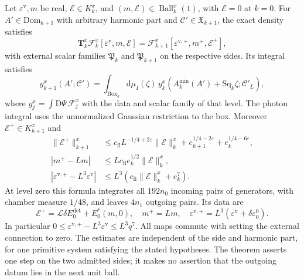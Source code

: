 \documentclass[11pt,letterpaper,reqno]{amsart}
\newcommand{\dd}{\mathrm d}
\begin{document}
\begin{theorem}
Let $\varepsilon^{\mathrm v},m$ be real,
$\mathscr E\in K_k^x$, and
$(m,\mathscr E)\in\operatorname{Ball}_k^x(1)$, with
$\mathscr E=0$ at $k=0$. For $A'\in\mathrm{Dom}_{k+1}$
with arbitrary harmonic part and
$\mathscr C'\in\mathfrak X_{k+1}$, the exact density satisfies
\begin{equation}\label{eq:rgnl-exact-step}
 \mathbf T_k^x\mathscr F_k^x[\varepsilon^{\mathrm v},m,\mathscr E]
   =\mathscr F_{k+1}^x
            [\varepsilon^{\mathrm v,+},m^+,\mathscr E^+],
\end{equation}
with external scalar families $\mathfrak P_k$ and
$\mathfrak P_{k+1}$ on the respective sides.
Its integral satisfies
\begin{equation}\label{eq:rgnl-integrated-step}
 y_{k+1}^x(A';\mathscr C')
  =\int_{\mathrm{Box}_k}\dd\mu_I(\zeta)\,
        y_k^x(A_k^{\min}(A')+\mathrm{Sq}_k\zeta;\mathscr C'_L),
\end{equation}
where $y_j^x=\int\mathrm D\Psi\,\mathscr F_j^x$ with the
data and scalar family of that level. The photon integral uses the
unnormalized Gaussian restriction to the box.
Moreover $\mathscr E^+\in K_{k+1}^x$ and
\begin{align}
 \|\mathscr E^+\|_{k+1}^x
 &\le c_{\mathrm{fl}}L^{-1/4+2\varepsilon}\|\mathscr E\|_k^x
           +e_{k+1}^{1/4-2\varepsilon}+e_k^{1/4-6\varepsilon},
                                      \label{eq:rgnl-activity-step-bound}\\
 |m^+-Lm|
 &\le Lc_{\mathrm{fl}}e_k^{1/2}\|\mathscr E\|_k^x,
                                      \label{eq:rgnl-mass-step-bound}\\
 |\varepsilon^{\mathrm v,+}-L^3\varepsilon^{\mathrm v}|
 &\le L^3(c_{\mathrm{fl}}\|\mathscr E\|_k^x+e_k^7).
                                      \label{eq:rgnl-vacuum-step-bound}
\end{align}
At level zero this formula integrates all $192n_0$
incoming pairs of generators, with chamber measure $1/48$,
and leaves $4n_1$ outgoing pairs. Its data are
\[
 \mathscr E^+=\mathcal L\delta E_0^{\mathrm{det}}+E_0^*(m,0),
 \quad m^+=Lm,\quad
 \varepsilon^{\mathrm v,+}
                         =L^3(\varepsilon^{\mathrm v}+\delta\varepsilon_0^0).
\]
In particular
$0\le\varepsilon^{\mathrm v,+}-L^3\varepsilon^{\mathrm v}
\le L^3q^7$.
All maps commute with setting the external connection to zero.
The estimates are independent of the side and harmonic part, for
one primitive system satisfying the stated hypotheses. The theorem
asserts one step on the two admitted sides; it makes no assertion
that the outgoing datum lies in the next unit ball.
\end{theorem}
\end{document}

